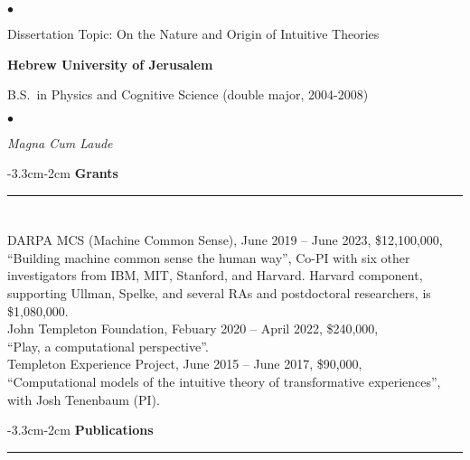 \documentclass[margin,line,pifont,palatino,courier]{res}
\newenvironment{list1}{
  \begin{list}{\ding{113}}{%
      \setlength{\itemsep}{0in}
      \setlength{\parsep}{0in} \setlength{\parskip}{0in}
      \setlength{\topsep}{0in} \setlength{\partopsep}{0in}
      \setlength{\leftmargin}{0.17in}}}{\end{list}}
\newenvironment{list2}{
  \begin{list}{$\bullet$}{%
      \setlength{\itemsep}{0in}
      \setlength{\parsep}{0in} \setlength{\parskip}{0in}
      \setlength{\topsep}{0in} \setlength{\partopsep}{0in}
      \setlength{\leftmargin}{0.2in}}}{\end{list}}
\begin{document}
\begin{resume}
\begin{list1}
\begin{list2}
\vspace*{.05in}
\item Dissertation Topic:  On the Nature and Origin of Intuitive Theories
\end{list2}
\end{list1}

{\bf Hebrew University of Jerusalem}\\
\vspace*{-.1in}
\begin{list1}
\item[] B.S.~in Physics and Cognitive Science (double major, 2004-2008)

\begin{list2}
\vspace*{.05in}
\item \textit{Magna Cum Laude}
\end{list2}

\end{list1}

\begin{adjustwidth*}{-3.3cm}{-2cm}
\textbf{Grants}\\
\noindent\rule{8cm}{0.4pt}

\end{adjustwidth*}

\section{\sc } 

DARPA MCS (Machine Common Sense), June 2019 -- June 2023, \$12,100,000, \\
``Building machine common sense the human way'', Co-PI with six other investigators from IBM,
MIT, Stanford, and Harvard. Harvard component, supporting Ullman, Spelke, and
several RAs and postdoctoral researchers, is \$1,080,000.\\

John Templeton Foundation, Febuary 2020 -- April 2022, \$240,000, \\
``Play, a computational perspective''.\\

Templeton Experience Project, June 2015 -- June 2017, \$90,000, \\
``Computational models of the intuitive theory of transformative experiences'', with Josh Tenenbaum (PI).

\begin{adjustwidth*}{-3.3cm}{-2cm}
\textbf{Publications}\\
\noindent\rule{8cm}{0.4pt}


\end{adjustwidth*}
\end{resume}
\end{document}

